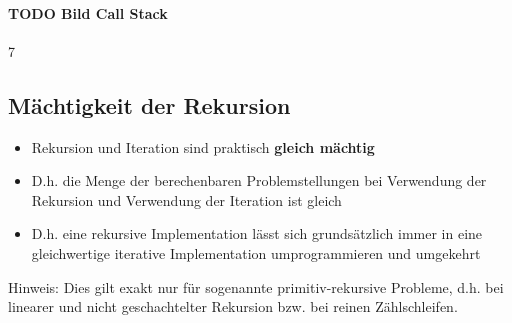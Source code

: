 \documentclass[10pt,a4paper]{article}
\begin{document}
\paragraph{TODO Bild Call Stack}7

\subsection{Mächtigkeit der Rekursion}
\begin{itemize}[noitemsep,topsep=0pt,leftmargin=*]
    \item Rekursion und Iteration sind praktisch \textbf{gleich mächtig}
    \item D.h. die Menge der berechenbaren Problemstellungen bei Verwendung der Rekursion und Verwendung der Iteration ist gleich
    \item D.h. eine rekursive Implementation lässt sich grundsätzlich immer in eine gleichwertige iterative Implementation umprogrammieren und umgekehrt
\end{itemize}
Hinweis: Dies gilt exakt nur für sogenannte primitiv-rekursive Probleme, d.h. bei linearer und nicht geschachtelter Rekursion bzw. bei reinen Zählschleifen.
\end{document}
